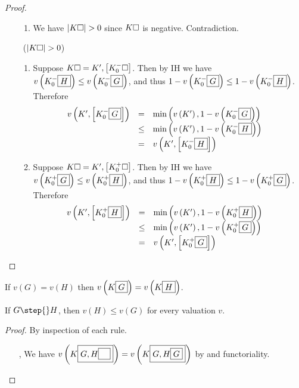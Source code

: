\begin{scope}
\begin{proof}
\begin{itemize}
\begin{enumerate}
        \item We have $\left|K\square\right| > 0$ since $K\square$ is negative.
        Contradiction.
      \end{enumerate}
    \item[\rcase~($\left|K\square\right| > 0$)]\sbr
      \begin{enumerate}
        \item Suppose $K\square = K', \left[K_0^-\square\right]$. Then by IH we have
        $v\left(K_0^-\fbox{$H$}\right) \leq v\left(K_0^-\fbox{$G$}\right)$, and thus
        $1 - v\left(K_0^-\fbox{$G$}\right) \leq 1 - v\left(K_0^-\fbox{$H$}\right)$. Therefore
        $$
        \begin{array}{rcll}
          v\left(K', \left[K_0^-\fbox{$G$}\right]\right)
          &=& \min\left(v\left(K'\right), 1 - v\left(K_0^-\fbox{$G$}\right)\right) & \\
          &\leq& \min\left(v\left(K'\right), 1 - v\left(K_0^-\fbox{$H$}\right)\right) & \\
          &=& v\left(K', \left[K_0^-\fbox{$H$}\right]\right) &
        \end{array}
        $$

        \item Suppose $K\square = K', \left[K_0^+\square\right]$. Then by IH we have
        $v\left(K_0^+\fbox{$G$}\right) \leq v\left(K_0^+\fbox{$H$}\right)$, and thus
        $1 - v\left(K_0^+\fbox{$H$}\right) \leq 1 - v\left(K_0^+\fbox{$G$}\right)$. Therefore
        $$
        \begin{array}{rcll}
          v\left(K', \left[K_0^+\fbox{$H$}\right]\right)
          &=& \min\left(v\left(K'\right), 1 - v\left(K_0^+\fbox{$H$}\right)\right) & \\
          &\leq& \min\left(v\left(K'\right), 1 - v\left(K_0^+\fbox{$G$}\right)\right) & \\
          &=& v\left(K', \left[K_0^+\fbox{$G$}\right]\right) &
        \end{array}
        $$
      \end{enumerate}
  \end{itemize}
\end{proof}

\begin{corollary}[Functoriality]\label{cor:eg-functoriality}
  If $v(G) = v(H)$ then $v\left(K\fbox{$G$}\right) = v\left(K\fbox{$H$}\right)$.
\end{corollary}

\begin{theorem}[Soundness]
  If $G \step{} H$, then $v(H) \leq v(G)$ for every valuation $v$.
\end{theorem}
\begin{proof}
  By inspection of each rule.
  \begin{itemize}
    \item[\kl{Iter}, \kl{Deit}] We have $v\left(K\fbox{$G,
    H\fbox{$\phantom{G}$}$}\right) = v\left(K\fbox{$G, H\fbox{$G$}$}\right)$ by
     and functoriality.


\end{itemize}
\end{proof}
\end{scope}
